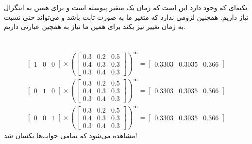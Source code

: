 \documentclass[]{article}
\begin{document}
\section{}
نکته‌ای که وجود دارد این است که زمان یک متغیر پیوسته است و برای همین به انتگرال نیاز داریم. همچنین لزومی
ندارد که متغیر ما به صورت ثابت باشد و می‌تواند حتی نسبت به زمان تغییر نیز بکند برای همین ما نیاز
به همچین عبارتی داریم.

\section{}
\begin{gather*}
    \begin{bmatrix}
        1 & 0 & 0
    \end{bmatrix}
    \times
    \left(
        \begin{bmatrix}
            0.3 & 0.2 & 0.5\\
            0.4 & 0.3 & 0.3\\
            0.3 & 0.4 & 0.3
        \end{bmatrix}
    \right)^\infty
    =
    \begin{bmatrix}
        0.3303 & 0.3035 & 0.366
    \end{bmatrix}\\
    \begin{bmatrix}
        0 & 1 & 0
    \end{bmatrix}
    \times
    \left(
        \begin{bmatrix}
            0.3 & 0.2 & 0.5\\
            0.4 & 0.3 & 0.3\\
            0.3 & 0.4 & 0.3
        \end{bmatrix}
    \right)^\infty
    =
    \begin{bmatrix}
        0.3303 & 0.3035 & 0.366
    \end{bmatrix}\\
    \begin{bmatrix}
        0 & 0 & 1
    \end{bmatrix}
    \times
    \left(
        \begin{bmatrix}
            0.3 & 0.2 & 0.5\\
            0.4 & 0.3 & 0.3\\
            0.3 & 0.4 & 0.3
        \end{bmatrix}
    \right)^\infty
    =
    \begin{bmatrix}
        0.3303 & 0.3035 & 0.366
    \end{bmatrix}
\end{gather*}
مشاهده می‌شود که تمامی جواب‌ها یکسان شد!
\end{document}
